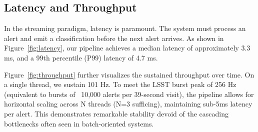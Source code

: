 \documentclass[10pt,journal,compsoc]{IEEEtran}
\begin{document}
\begin{table}[htbp]
    \centering
    \caption{Comprehensive Benchmark Summary on ZTF Data}
    \label{tab:benchmark_summary}
\end{table}

\subsection{Latency and Throughput}
In the streaming paradigm, latency is paramount. The system must process an alert and emit a classification before the next alert arrives. As shown in Figure~\ref{fig:latency}, our pipeline achieves a median latency of approximately 3.3 ms, and a 99th percentile (P99) latency of 4.7 ms. 

Figure~\ref{fig:throughput} further visualizes the sustained throughput over time. On a single thread, we sustain 101 Hz. To meet the LSST burst peak of 256 Hz (equivalent to bursts of ~10,000 alerts per 39-second visit), the pipeline allows for horizontal scaling across N threads (N=3 sufficing), maintaining sub-5ms latency per alert. This demonstrates remarkable stability devoid of the cascading bottlenecks often seen in batch-oriented systems.
\end{document}
